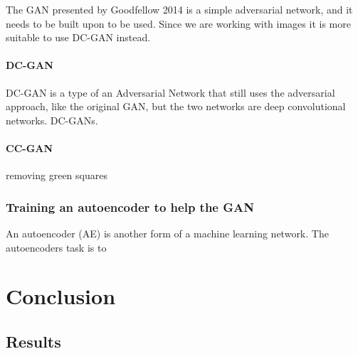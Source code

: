 \documentclass[a4paper,english]{ifimaster}
\begin{document}
The GAN presented by Goodfellow 2014\cite{GoodfellowGAN} is a simple adversarial network, and it needs to be built upon to be used. Since we are working with images it is more suitable to use
DC-GAN instead. 

\subsection{DC-GAN}
  DC-GAN is a type of an Adversarial Network that still uses the adversarial approach, like the original GAN, but the two networks are deep convolutional networks. DC-GANs.
\subsection{CC-GAN}
  removing green squares

\section{Training an autoencoder to help the GAN}
An autoencoder (AE) is another form of a machine learning network. The autoencoders task is to  

\part{Conclusion}

\chapter{Results}

\backmatter{}

\printbibliography
\end{document}
